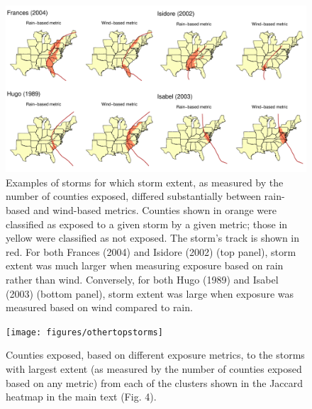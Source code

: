 \documentclass[fleqn,10pt,lineno]{olplainarticle}
\begin{document}
\clearpage

\begin{figure}[tbhp!]
\centering
\includegraphics[width=\linewidth]{figures/extentdisagreement}
\caption{Examples of storms for which storm extent, as measured by the number of counties exposed, differed substantially between rain-based and wind-based metrics. Counties shown in orange were classified as exposed to a given storm by a given metric; those in yellow were classified as not exposed. The storm's track is shown in red. For both Frances (2004) and Isidore (2002) (top panel), storm extent was much larger when measuring exposure based on rain rather than wind. Conversely, for both Hugo (1989) and Isabel (2003) (bottom panel), storm extent was large when exposure was measured based on wind compared to rain.}
\label{fig:extentdisagreement}
\end{figure}

\begin{figure}[tbhp!]
\centering
\texttt{[image: figures/othertopstorms]}
\caption{Counties exposed, based on different exposure metrics, to the storms with largest extent (as measured by the number of counties exposed based on any metric) from each of the clusters shown in the Jaccard heatmap in the main text (Fig. 4).}
\label{fig:othertopstorms}
\end{figure}
\end{document}
